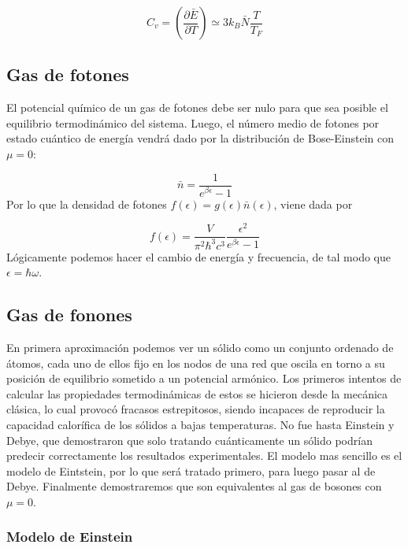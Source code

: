 \documentclass[12pt,a4paper]{article}
\numberwithin{equation}{section}
\numberwithin{figure}{section}
\newcommand{\parentesis}[1]{\left( #1  \right)}
\newcommand{\parciales}[2]{\frac{\partial #1}{\partial #2}}
\newcommand{\pparciales}[2]{\parentesis{\parciales{#1}{#2}}}
\theoremstyle{definition}
\begin{document}
\begin{equation}
C_v = \pparciales{\bar{E}}{T} \simeq 3 k_B \bar{N} \frac{T}{T_F}
\end{equation} 

\subsection{Gas de fotones}

El potencial químico de un gas de fotones debe ser nulo para que sea posible el equilibrio termodinámico del sistema. Luego, el número medio de fotones por estado cuántico de energía vendrá dado por la distribución de Bose-Einstein con $\mu=0$:

\begin{equation}
\bar{n} = \frac{1}{e^{\beta \epsilon}-1}
\end{equation}
Por lo que la densidad de fotones $f(\epsilon)=g(\epsilon)\bar{n}(\epsilon)$, viene dada por

\begin{equation}
f(\epsilon) = \frac{V}{\pi^2 \hbar^3 c^3} \frac{\epsilon^2}{e^{\beta \epsilon}-1} 
\end{equation}
Lógicamente podemos hacer el cambio de energía y frecuencia, de tal modo que $\epsilon = \hbar \omega$. 

\subsection{Gas de fonones}

En primera aproximación podemos ver un sólido como un conjunto ordenado de átomos, cada uno de ellos fijo en los nodos de una red que oscila en torno a su posición de equilibrio sometido a un potencial armónico. Los primeros intentos de calcular las propiedades termodinámicas de estos se hicieron desde la mecánica clásica, lo cual provocó fracasos estrepitosos, siendo incapaces de reproducir la capacidad calorífica de los sólidos a bajas temperaturas. No fue hasta Einstein y Debye, que demostraron que solo tratando cuánticamente un sólido podrían predecir correctamente los resultados experimentales. El modelo mas sencillo es el modelo de Eintstein, por lo que será tratado primero, para luego pasar al de Debye. Finalmente demostraremos que son equivalentes al gas de bosones con $\mu=0$.  

\subsubsection{Modelo de Einstein}
\end{document}
